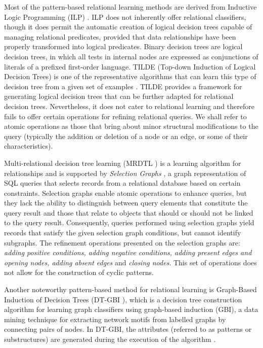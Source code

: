 \documentclass[mathematics,article,submit,pdftex,moreauthors]{Definitions/mdpi}
\begin{document}
Most of the pattern-based relational learning methods are derived from Inductive Logic Programming (ILP) \citep{plotkin1972automatic}. ILP does not inherently offer relational classifiers, though it does permit the automatic creation of logical decision trees capable of managing relational predicates, provided that data relationships have been properly transformed into logical predicates. Binary decision trees are logical decision trees, in which all tests in internal nodes are expressed as conjunctions of literals of a prefixed first-order language. TILDE (Top-down Induction of Logical Decision Trees) is one of the representative algorithms that can learn this type of decision tree from a given set of examples \citep{BLOCKEEL1998285}. TILDE provides a framework for generating logical decision trees that can be further adapted for relational decision trees. Nevertheless, it does not cater to relational learning and therefore fails to offer certain operations for refining relational queries. We shall refer to atomic operations as those that bring about minor structural modifications to the query (typically the addition or deletion of a node or an edge, or some of their characteristics).

Multi-relational decision tree learning (MRDTL \citep{Leiva02mrdtl:a}) is a learning algorithm for relationships and is supported by \textit{Selection Graphs} \citep{Knobbe99multi-relationaldecision}, a graph representation of SQL queries that selects records from a relational database based on certain constraints. Selection graphs enable atomic operations to enhance queries, but they lack the ability to distinguish between query elements that constitute the query result and those that relate to objects that should or should not be linked to the query result. Consequently, queries performed using selection graphs yield records that satisfy the given selection graph conditions, but cannot identify subgraphs. The refinement operations presented on the selection graphs are: \textit{adding positive conditions, adding negative conditions, adding present edges and opening nodes, adding absent edges} and \textit{closing nodes}. This set of operations does not allow for the construction of cyclic patterns.

Another noteworthy pattern-based method for relational learning is Graph-Based Induction of Decision Trees (DT-GBI \citep{Nguyen2005}), which is a decision tree construction algorithm for learning graph classifiers using graph-based induction (GBI), a data mining technique for extracting network motifs from labelled graphs by connecting pairs of nodes. In DT-GBI, the attributes (referred to as patterns or substructures) are generated during the execution of the algorithm \citep{Geamsakul2003}.
\end{document}
